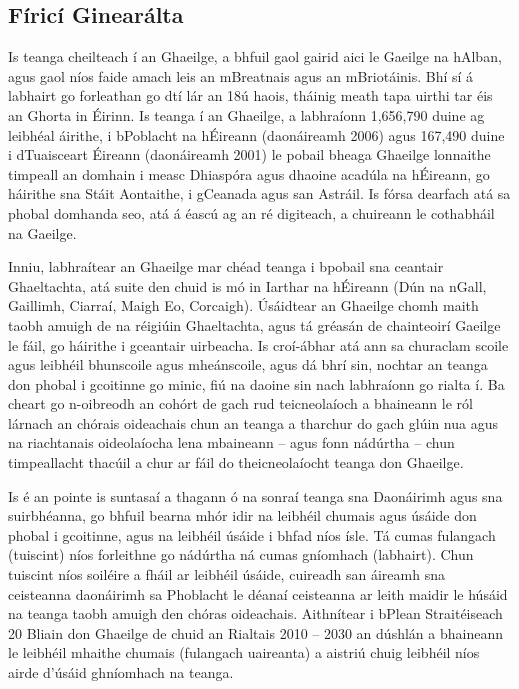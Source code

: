 \begin{multicols}{2}

\subsection{Fíricí Ginearálta}

Is teanga cheilteach í an Ghaeilge, a bhfuil gaol gairid aici le Gaeilge na hAlban, agus gaol níos faide amach leis an mBreatnais agus an mBriotáinis. Bhí sí á labhairt go forleathan go dtí lár an 18ú haois, tháinig meath tapa uirthi tar éis an Ghorta in Éirinn. Is teanga í an Ghaeilge, a labhraíonn 1,656,790 duine ag leibhéal áirithe, i bPoblacht na hÉireann (daonáireamh 2006) agus 167,490 duine i dTuaisceart Éireann (daonáireamh 2001) le pobail bheaga Ghaeilge lonnaithe timpeall an domhain i measc Dhiaspóra agus dhaoine acadúla na hÉireann, go háirithe sna Stáit Aontaithe, i gCeanada agus san Astráil. Is fórsa dearfach atá sa phobal domhanda seo, atá á éascú ag an ré digiteach, a chuireann le cothabháil na Gaeilge.

Inniu, labhraítear an Ghaeilge mar chéad teanga i bpobail sna ceantair Ghaeltachta, atá suite den chuid is mó in Iarthar na hÉireann (Dún na nGall, Gaillimh, Ciarraí, Maigh Eo, Corcaigh). Úsáidtear an Ghaeilge chomh maith taobh amuigh de na réigiúin Ghaeltachta, agus tá gréasán de chainteoirí Gaeilge le fáil, go háirithe i gceantair uirbeacha.   Is croí-ábhar atá ann sa churaclam scoile agus leibhéil bhunscoile agus mheánscoile, agus dá bhrí sin, nochtar an teanga don phobal i gcoitinne go minic, fiú na daoine sin nach labhraíonn go rialta í. Ba cheart go n-oibreodh an cohórt de gach rud teicneolaíoch a bhaineann le ról lárnach an chórais oideachais chun an teanga a tharchur do gach glúin nua \cite{oriagain97} agus na riachtanais oideolaíocha lena mbaineann – agus fonn nádúrtha – chun timpeallacht thacúil a chur ar fáil do theicneolaíocht teanga don Ghaeilge.

Is é an pointe is suntasaí a thagann ó na sonraí teanga sna Daonáirimh agus sna suirbhéanna, go bhfuil bearna mhór idir na leibhéil chumais agus úsáide don phobal i gcoitinne, agus na leibhéil úsáide i bhfad níos ísle. Tá cumas fulangach (tuiscint) níos forleithne go nádúrtha ná cumas gníomhach (labhairt). Chun tuiscint níos soiléire a fháil ar leibhéil úsáide, cuireadh san áireamh sna ceisteanna daonáirimh sa Phoblacht le déanaí ceisteanna ar leith maidir le húsáid na teanga taobh amuigh den chóras oideachais. Aithnítear i bPlean Straitéiseach 20 Bliain don Ghaeilge de chuid an Rialtais 2010 -- 2030 an dúshlán a bhaineann le leibhéil mhaithe chumais (fulangach uaireanta) a aistriú chuig leibhéil níos airde d’úsáid ghníomhach na teanga.


\end{multicols}
